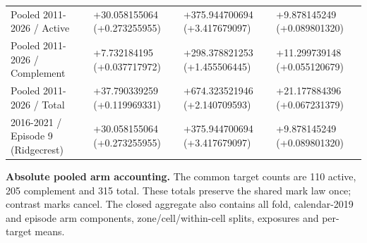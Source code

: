 \begin{longtable}
{}Pooled 2011-2026 / Active & +30.058155064 (+0.273255955) & +375.944700694 (+3.417679097) & +9.878145249 (+0.089801320) \\
{}Pooled 2011-2026 / Complement & +7.732184195 (+0.037717972) & +298.378821253 (+1.455506445) & +11.299739148 (+0.055120679) \\
{}Pooled 2011-2026 / Total & +37.790339259 (+0.119969331) & +674.323521946 (+2.140709593) & +21.177884396 (+0.067231379) \\
{}2016-2021 / Episode 9 (Ridgecrest) & +30.058155064 (+0.273255955) & +375.944700694 (+3.417679097) & +9.878145249 (+0.089801320) \\
\end{longtable}\endgroup

\textbf{Absolute pooled arm accounting.} The common target counts are 110 active, 205 complement and 315 total. These totals preserve the shared mark law once; contrast marks cancel. The closed aggregate also contains all fold, calendar-2019 and episode arm components, zone/cell/within-cell splits, exposures and per-target means.

